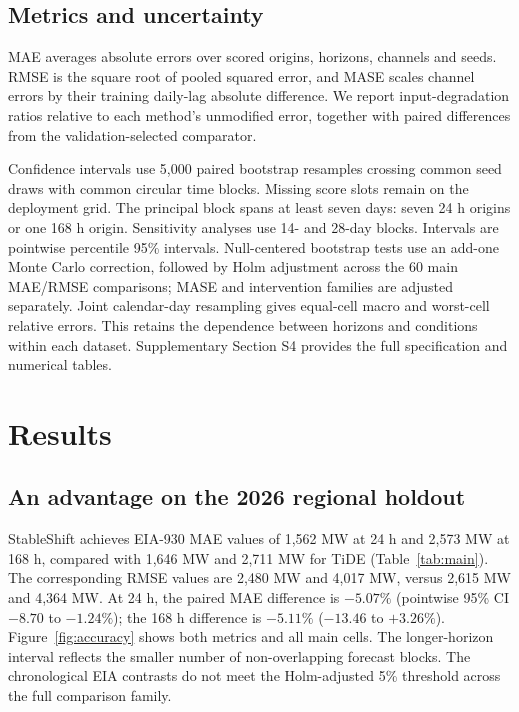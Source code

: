 \documentclass[final,5p,times]{elsarticle}
\begin{document}
\subsection{Metrics and uncertainty}
MAE averages absolute errors over scored origins, horizons, channels and seeds. RMSE is the square root of pooled squared error, and MASE scales channel errors by their training daily-lag absolute difference. We report input-degradation ratios relative to each method's unmodified error, together with paired differences from the validation-selected comparator.

Confidence intervals use 5,000 paired bootstrap resamples crossing common seed draws with common circular time blocks. Missing score slots remain on the deployment grid. The principal block spans at least seven days: seven 24 h origins or one 168 h origin. Sensitivity analyses use 14- and 28-day blocks. Intervals are pointwise percentile 95\% intervals. Null-centered bootstrap tests use an add-one Monte Carlo correction, followed by Holm adjustment across the 60 main MAE/RMSE comparisons; MASE and intervention families are adjusted separately. Joint calendar-day resampling gives equal-cell macro and worst-cell relative errors. This retains the dependence between horizons and conditions within each dataset. Supplementary Section S4 provides the full specification and numerical tables.

\begin{strip}\vspace{0pt}\end{strip}
\clearpage
\section{Results}
\subsection{An advantage on the 2026 regional holdout}
StableShift achieves EIA-930 MAE values of 1,562 MW at 24 h and 2,573 MW at 168 h, compared with 1,646 MW and 2,711 MW for TiDE (Table~\ref{tab:main}). The corresponding RMSE values are 2,480 MW and 4,017 MW, versus 2,615 MW and 4,364 MW. At 24 h, the paired MAE difference is $-5.07\%$ (pointwise 95\% CI $-8.70$ to $-1.24\%$); the 168 h difference is $-5.11\%$ ($-13.46$ to $+3.26\%$). Figure~\ref{fig:accuracy} shows both metrics and all main cells. The longer-horizon interval reflects the smaller number of non-overlapping forecast blocks. The chronological EIA contrasts do not meet the Holm-adjusted 5\% threshold across the full comparison family.
\end{document}
